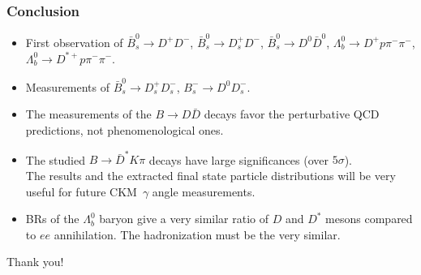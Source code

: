 \documentclass[10pt, aspectratio=169]{beamer}
\def\Lb{{\Lambda_b^0}}
\def\pim{{\pi^-}}
\def\Dp{{D^+}}
\def\Dstarp{{D^{*+}}{}}
\begin{document}
\begin{frame}[label=conclusion]%
  \frametitle{Conclusion}

  \begin{itemize}
    \item First observation of
      $\bar{B}_s^0 \to D^+ D^-$,
      $\bar{B}_s^0 \to D_s^+ D^-$,
      $\bar{B}_s^0 \to D^0 \bar{D}^0$,
      $\Lb\to\Dp p\pim\pim$,
      $\Lb\to\Dstarp p\pim\pim$.
    \item Measurements of
      $\bar{B}_s^0 \to D_s^+ D_s^-$,
      ${B}_s^- \to D^0 D_s^-$.
    \item The measurements of the $B\to D \bar{D}$ decays favor the 
      perturbative QCD predictions, not phenomenological ones.

    \item The studied $B\to \bar{D}^* K \pi$ decays have large 
      significances (over $5\sigma$).
      \\ The results and the extracted final state particle 
      distributions will be very useful for future CKM~$\gamma$ 
      angle measurements.

    \item BRs of the $\Lb$ baryon give a very similar ratio of $D$ and 
      $D^*$ mesons compared to $ee$ annihilation.
      The hadronization must be the very similar.
  \end{itemize}

  \pause

  \centering \vfill
  \hfill Thank you! \hfill\null
\end{frame}%
\end{document}
